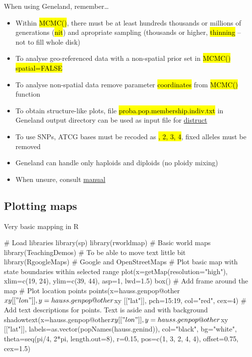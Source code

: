 \documentclass[compress, ucs, xelatex, 11pt, xcolor=svgnames,
  hyperref={
    bookmarks=true,
    unicode=true,
    colorlinks=true,
    pdftitle={Molecular data in R},
    plainpages=false,
    pdfauthor={Vojtech Zeisek},
    pdfsubject={Course about phylogeny and evolution in R},
    pdfcreator={XeLaTeX},
    pdfkeywords={R, evolution, phylogeny, molecular data},
    linkcolor=Tomato,
    anchorcolor=SaddleBrown,
    citecolor=Goldenrod,
    filecolor=DarkMagenta,
    menucolor=Sienna,
    urlcolor=DarkTurquoise,
    pdftex},
  url={hyphens, lowtilde} %
  ]{beamer}
\renewcommand{\texttt}[1]{\hl{\ttfamily #1}}
\begin{document}
\begin{frame}{When using Geneland, remember\ldots}
  \begin{itemize}
    \item Within \texttt{MCMC()}, there must be at least hundreds thousands or millions of generations (\texttt{nit}) and apropriate sampling (thousands or higher, \texttt{thinning} -- not to fill whole disk)
    \item To analyse geo-referenced data with a non-spatial prior set in \texttt{MCMC()} \texttt{spatial=FALSE}
    \item To analyse non-spatial data remove parameter \texttt{coordinates} from \texttt{MCMC()} function
    \item To obtain structure-like plots, file \texttt{proba.pop.membership.indiv.txt} in Geneland output directory can be used as input file for \href{https://web.stanford.edu/group/rosenberglab/distruct.html}{distruct}
    \item To use SNPs, ATCG bases must be recoded as \texttt{1, 2, 3, 4}, fixed alleles must be removed
    \item Geneland can handle only haploids and diploids (no ploidy mixing)
    \item When unsure, consult \href{https://www2.imm.dtu.dk/~gigu/Geneland/Geneland-Doc.pdf}{manual}
  \end{itemize}
\end{frame}

\subsection{Plotting maps}

\begin{frame}[fragile]{Very basic mapping in R}
  \begin{spluscode}
    # Load libraries
    library(sp)
    library(rworldmap) # Basic world maps
    library(TeachingDemos) # To be able to move text little bit
    library(RgoogleMaps) # Google and OpenStreetMaps
    # Plot basic map with state boundaries within selected range
    plot(x=getMap(resolution="high"), xlim=c(19, 24), ylim=c(39, 44),
      asp=1, lwd=1.5)
    box() # Add frame around the map
    # Plot location points
    points(x=hauss.genpop@other$xy[["lon"]], y=hauss.genpop@other$xy
      [["lat"]], pch=15:19, col="red", cex=4)
    # Add text descriptions for points. Text is aside and with background
    shadowtext(x=hauss.genpop@other$xy[["lon"]], y=hauss.genpop@other$xy
      [["lat"]], labels=as.vector(popNames(hauss.genind)), col="black",
      bg="white", theta=seq(pi/4, 2*pi, length.out=8), r=0.15,
      pos=c(1, 3, 2, 4, 4), offset=0.75, cex=1.5)
  \end{spluscode}
\end{frame}
\end{document}
